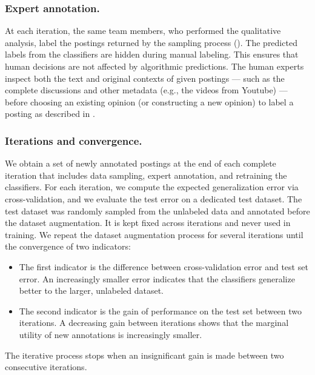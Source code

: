 \subsubsection{Expert annotation.}
At each iteration, the same team members, who performed the qualitative analysis, label the postings returned by the sampling process ().
The predicted labels from the classifiers are hidden during manual labeling.
This ensures that human decisions are not affected by algorithmic predictions.
The human experts inspect both the text and original contexts of given postings --- such as the complete discussions and other metadata (e.g., the videos from Youtube) --- before choosing an existing opinion (or constructing a new opinion) to label a posting as described in .

\subsubsection{Iterations and convergence.}
We obtain a set of newly annotated postings at the end of each complete iteration that includes data sampling, expert annotation, and retraining the classifiers. %
For each iteration, we compute the expected generalization error via cross-validation, and we evaluate the test error on a dedicated test dataset.
The test dataset was randomly sampled from the unlabeled data and annotated before  the dataset augmentation.
It is kept fixed across iterations and never used in training.
We repeat the dataset augmentation process for several iterations until the convergence of two indicators:
\begin{itemize}
    \item The first indicator is the difference between cross-validation error and test set error.
    An increasingly smaller error indicates that the classifiers generalize better to the larger, unlabeled dataset.
    \item The second indicator is the gain of performance on the test set between two iterations.
    A decreasing gain between iterations shows that the marginal utility of new annotations is increasingly smaller.
\end{itemize}
The iterative process stops when an insignificant gain is made between two consecutive iterations.

